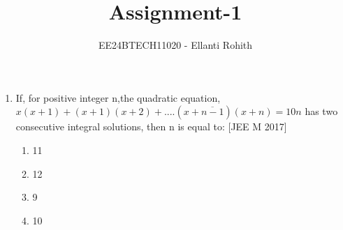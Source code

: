 \documentclass[journal,12pt,twocolumn]{IEEEtran}
\theoremstyle{remark}
\begin{document}

\vspace{3cm}

\title{Assignment-1}
\author{EE24BTECH11020 - Ellanti Rohith%
}
\maketitle
\newpage
\bigskip

\renewcommand{\thefigure}{\theenumi}
\renewcommand{\thetable}{\theenumi}
\begin{enumerate}
	\item {If, for positive integer n,the quadratic equation, $x(x+1)+(x+1)(x+2)+....(x+\overline{n-1})(x+n)=10n$  has two consecutive integral solutions, then n is equal to:     \hfill{[JEE M 2017]} \begin{multicols}{2} 
\begin{enumerate}
    \item {11}
    \item{12}
    \columnbreak
    \item {9} 
    \item{10}\end{enumerate} 
    \end{multicols}}



\end{enumerate}
\end{document}
